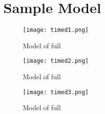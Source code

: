 \chapter{Sample Model}
\begin{figure}
  \texttt{[image: timed1.png]}
  \caption{Model of full \jcl}
\end{figure}
\begin{figure}
  \texttt{[image: timed2.png]}
  \caption{Model of full \jcl}
\end{figure}
\begin{figure}
  \texttt{[image: timed3.png]}
  \caption{Model of full \jcl}
\end{figure}